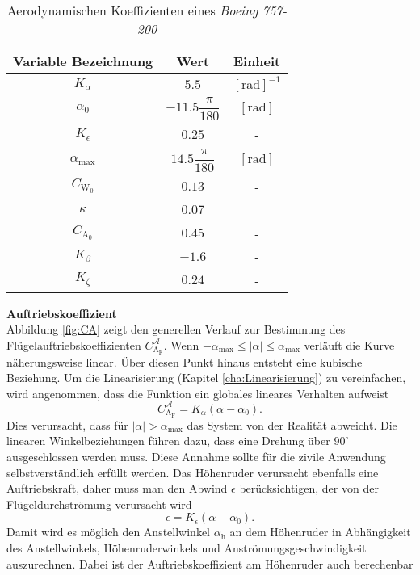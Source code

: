 \begin{table}[h]
\centering
 \begin{tabular}{||c c c  ||} 
 \hline
 Variable Bezeichnung & Wert & Einheit\\ 
 \hline\hline
 $K_\alpha$ & $5.5$ & $\mathrm{[rad]^{-1}}$ \\ 
 \hline
 $\alpha_0$ & $-11.5\dfrac{\pi}{180}$ & $\mathrm{[rad]}$ \\ 
 \hline
 $K_{\epsilon}$ & $0.25$ & - \\ 
 \hline
 $\alpha_\mathrm{max}$ & $14.5\dfrac{\pi}{180}$ & $\mathrm{[rad]}$ \\ 
 \hline
 $C_\mathrm{W_0}$ & $0.13$ & - \\ 
 \hline
 $\kappa$ & $0.07$ & -\\ 
 \hline
 $C_\mathrm{A_0}$ & $0.45$ & -\\ 
 \hline
 $K_\beta$ & $-1.6$ & -\\  
 \hline
 $K_\zeta$ & $0.24$ & -\\ 
 \hline
\end{tabular}
\caption{Aerodynamischen Koeffizienten eines \textit{Boeing 757-200}}
\label{tab:KonstBeiw}
\end{table}
\textbf{Auftriebskoeffizient}\\
Abbildung \ref{fig:CA} zeigt den generellen Verlauf zur Bestimmung des Flügelauftriebskoeffizienten $C_\mathrm{A_F}^\mathcal{A}$. Wenn $-\alpha_\mathrm{max}\leq|\alpha|\leq\alpha_\mathrm{max}$ verläuft die Kurve näherungsweise linear. Über diesen Punkt hinaus entsteht eine kubische Beziehung. Um die Linearisierung (Kapitel \ref{cha:Linearisierung}) zu vereinfachen, wird angenommen, dass die Funktion ein globales lineares Verhalten aufweist
\begin{equation}
C_\mathrm{A_F}^\mathcal{A} = K_\alpha(\alpha - \alpha_0).
\end{equation} 
Dies verursacht, dass für $|\alpha|> \alpha_\mathrm{max}$ das System von der Realität abweicht. Die linearen Winkelbeziehungen führen dazu, dass eine Drehung über $90^{\circ}$  ausgeschlossen werden muss. Diese Annahme sollte für die zivile Anwendung selbstverständlich erfüllt werden.
Das Höhenruder verursacht ebenfalls eine Auftriebskraft, daher muss man den Abwind $\epsilon$ berücksichtigen, der von der Flügeldurchströmung verursacht wird
\begin{equation}
\epsilon = K_{\epsilon}(\alpha-\alpha_\mathrm{0}).
\end{equation}
Damit wird es möglich den Anstellwinkel $\alpha_\mathrm{h}$ an dem Höhenruder in Abhängigkeit des Anstellwinkels, Höhenruderwinkels und Anströmungsgeschwindigkeit auszurechnen. Dabei ist der Auftriebskoeffizient am Höhenruder auch berechenbar \cite{RAMYoutube_Playlist}
